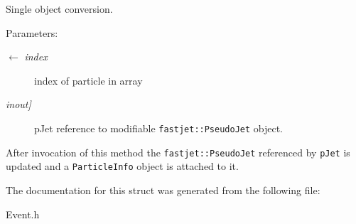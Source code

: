 Single object conversion. 

\begin{Desc}
\item[Parameters:]
\begin{description}
\item[\mbox{$\leftarrow$} {\em index}]index of particle in array \item[{\em inout\mbox{]}}]p\-Jet reference to modifiable {\tt fastjet::Pseudo\-Jet} object.\end{description}
\end{Desc}
After invocation of this method the {\tt fastjet::Pseudo\-Jet} referenced by {\tt p\-Jet} is updated and a {\tt Particle\-Info} object is attached to it. 

The documentation for this struct was generated from the following file:\begin{CompactItemize}
\item 
Event.h\end{CompactItemize}

